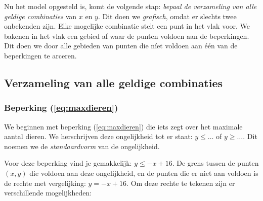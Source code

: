 Nu het model opgesteld is, komt 
de volgende stap: \emph{bepaal de verzameling van alle geldige
combinaties} van $x$ en $y$. Dit doen we \emph{grafisch}, omdat er
slechts twee onbekenden zijn. Elke mogelijke combinatie stelt een punt
in het vlak voor. We bakenen in het vlak een gebied af waar de punten voldoen aan de beperkingen. Dit doen we door alle gebieden van punten die n\'iet voldoen aan \'e\'en van de beperkingen te arceren. 

\subsection{Verzameling van alle geldige combinaties}

\subsubsection{Beperking (\ref{eq:maxdieren})}


We beginnen met beperking  (\ref{eq:maxdieren}) die iets zegt over het maximale
aantal dieren. We herschrijven deze ongelijkheid tot er staat: $y \leqslant
\ldots$ of $y \geqslant \ldots$. Dit noemen we de \emph{standaardvorm}
van de ongelijkheid.

Voor deze beperking vind je gemakkelijk: $y \leqslant -x + 16$. De grens tussen de punten $(x,y)$ die voldoen aan
deze ongelijkheid, en de punten die er niet aan voldoen is de
rechte met vergelijking: $y=-x + 16$.
Om deze rechte te tekenen zijn er verschillende mogelijkheden:

